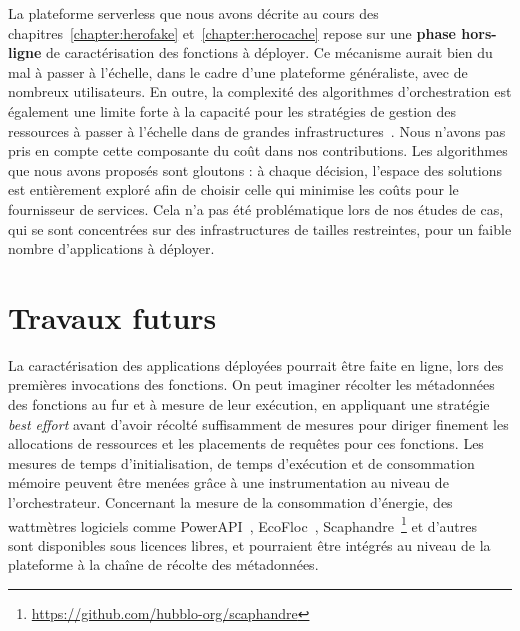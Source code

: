 La plateforme serverless que nous avons décrite au cours des chapitres~\ref{chapter:herofake} et~\ref{chapter:herocache} repose sur une \textbf{phase hors-ligne} de caractérisation des fonctions à déployer. Ce mécanisme aurait bien du mal à passer à l'échelle, dans le cadre d'une plateforme généraliste, avec de nombreux utilisateurs. En outre, la complexité des algorithmes d'orchestration est également une limite forte à la capacité pour les stratégies de gestion des ressources à passer à l'échelle dans de grandes infrastructures~\cite{fuerstIluvatarFastControl2023}. Nous n'avons pas pris en compte cette composante du coût dans nos contributions. Les algorithmes que nous avons proposés sont gloutons : à chaque décision, l'espace des solutions est entièrement exploré afin de choisir celle qui minimise les coûts pour le fournisseur de services. Cela n'a pas été problématique lors de nos études de cas, qui se sont concentrées sur des infrastructures de tailles restreintes, pour un faible nombre d'applications à déployer.

\section{Travaux futurs}
\label{section:conclusion-perspectives}


La caractérisation des applications déployées pourrait être faite en ligne, lors des premières invocations des fonctions. On peut imaginer récolter les métadonnées des fonctions au fur et à mesure de leur exécution, en appliquant une stratégie \textit{best effort} avant d'avoir récolté suffisamment de mesures pour diriger finement les allocations de ressources et les placements de requêtes pour ces fonctions. Les mesures de temps d'initialisation, de temps d'exécution et de consommation mémoire peuvent être menées grâce à une instrumentation au niveau de l'orchestrateur. Concernant la mesure de la consommation d'énergie, des wattmètres logiciels comme PowerAPI~\cite{fieniPowerAPIPythonFramework2024}, EcoFloc~\cite{valeraEnergySavingPerspective}, Scaphandre~\footnote{\href{https://github.com/hubblo-org/scaphandre}{https://github.com/hubblo-org/scaphandre}} et d'autres~\cite{jayExperimentalComparisonSoftwarebased2023} sont disponibles sous licences libres, et pourraient être intégrés au niveau de la plateforme à la chaîne de récolte des métadonnées.

